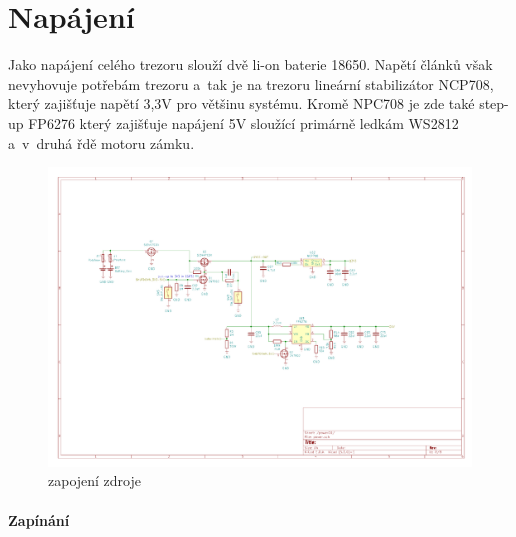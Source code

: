 \section*{Napájení}

Jako napájení celého trezoru slouží dvě li-on baterie 18650. Napětí článků však nevyhovuje potřebám trezoru a~tak je na trezoru lineární 
stabilizátor NCP708, který zajišťuje napětí 3,3V pro většinu systému. Kromě NPC708 je zde také step-up FP6276 který zajišťuje napájení 5V 
sloužící primárně ledkám WS2812 a~v~druhá řdě motoru zámku. 

\begin{figure}[htbp]
    \centering
    \includegraphics[width=\textwidth]{kapitoly/obrazky/E4/napajeni/zdroj.pdf}
    \caption{zapojení zdroje}
    \label{fig:zdroj}
\end{figure}

\newpage

\paragraph*{Zapínání}

